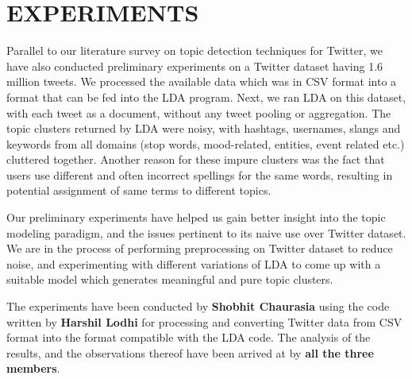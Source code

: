 \section{\uppercase{Experiments}}
Parallel to our literature survey on topic detection techniques for Twitter, we have also conducted preliminary experiments on a Twitter dataset having 1.6 million tweets. We processed the available data which was in CSV format into a format that can be fed into the LDA program. Next, we ran LDA on this dataset, with each tweet as a document, without any tweet pooling or aggregation. The topic clusters returned by LDA were noisy, with hashtags, usernames, slangs and keywords from all domains (stop words, mood-related, entities, event related etc.) cluttered together. Another reason for these impure clusters was the fact that users use different and often incorrect spellings for the same words, resulting in potential assignment of same terms to different topics.

Our preliminary experiments have helped us gain better insight into the topic modeling paradigm, and the issues pertinent to its naive use over Twitter dataset. We are in the process of performing preprocessing on Twitter dataset to reduce noise, and experimenting with different variations of LDA to come up with a suitable model which generates meaningful and pure topic clusters.

The experiments have been conducted by {\bf Shobhit Chaurasia} using the code written by {\bf Harshil Lodhi} for processing and converting Twitter data from CSV format into the format compatible with the LDA code. The analysis of the results, and the observations thereof have been arrived at by {\bf all the three members}.
